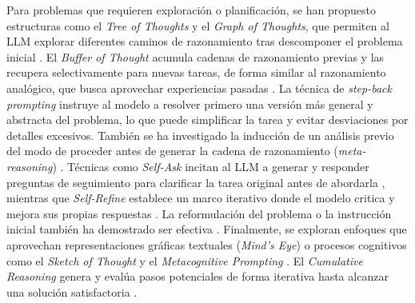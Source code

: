 Para problemas que requieren exploración o planificación, se han propuesto estructuras como el \textit{Tree of Thoughts} y el \textit{Graph of Thoughts}, que permiten al LLM explorar diferentes caminos de razonamiento tras descomponer el problema inicial \parencite{yaoTreeThoughtsDeliberate2023, bestaGraphThoughtsSolving2024}. El \textit{Buffer of Thought} \parencite{yangBufferThoughtsThoughtAugmented2024} acumula cadenas de razonamiento previas y las recupera selectivamente para nuevas tareas, de forma similar al razonamiento analógico, que busca aprovechar experiencias pasadas \parencite{yasunagaLargeLanguageModels2024}. La técnica de \textit{step-back prompting}\parencite{zhengTakeStepBack2024} instruye al modelo a resolver primero una versión más general y abstracta del problema, lo que puede simplificar la tarea y evitar desviaciones por detalles excesivos. También se ha investigado la inducción de un análisis previo del modo de proceder antes de generar la cadena de razonamiento (\textit{meta-reasoning}) \parencite{gaoMetaReasoningLarge2024}. Técnicas como \textit{Self-Ask} incitan al LLM a generar y responder preguntas de seguimiento para clarificar la tarea original antes de abordarla \parencite{pressMeasuringNarrowingCompositionality2023}, mientras que \textit{Self-Refine} establece un marco iterativo donde el modelo critica y mejora sus propias respuestas \parencite{madaanSelfRefineIterativeRefinement2023}. La reformulación del problema o la instrucción inicial también ha demostrado ser efectiva \parencite{mishraReframingInstructionalPrompts2022, dengRephraseRespondLet2024}. Finalmente, se exploran enfoques que aprovechan representaciones gráficas textuales (\textit{Mind's Eye}) \parencite{wuMindsEyeLLMs} o procesos cognitivos como el \textit{Sketch of Thought} \parencite{aytesSketchofThoughtEfficientLLM2025} y el \textit{Metacognitive Prompting} \parencite{wangMetacognitivePromptingImproves2024}. El \textit{Cumulative Reasoning} genera y evalúa pasos potenciales de forma iterativa hasta alcanzar una solución satisfactoria \parencite{zhangCumulativeReasoningLarge2025}.

